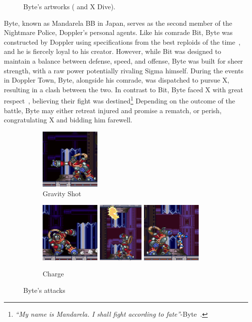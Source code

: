 \begin{figure}[htp]
	\caption{Byte's artworks (\cite{book:MMX_Complete_art} and X Dive).}
\end{figure}
Byte, known as Mandarela BB in Japan, serves as the second member of the Nightmare Police, Doppler's personal agents. Like his comrade Bit, Byte was constructed by Doppler using specifications from the best reploids of the time~\cite{book:MH_field_guide}, and he is fiercely loyal to his creator. However, while Bit was designed to maintain a balance between defense, speed, and offense, Byte was built for sheer strength, with a raw power potentially rivaling Sigma himself. During the events in Doppler Town, Byte, alongside his comrade, was dispatched to pursue X, resulting in a clash between the two. In contrast to Bit, Byte faced X with great respect~\cite{wiki:Byte}, believing their fight was destined\footnote{\textit{``My name is Mandarela. I shall fight according to fate''}-Byte~\cite{wordpress:X3_japanese_script}.} Depending on the outcome of the battle, Byte may either retreat injured and promise a rematch, or perish, congratulating X and bidding him farewell.
\begin{figure}[htp]
	\centering
	\begin{subfigure}{.4\linewidth}
		\centering
		\includegraphics[height=3cm]{figures/X3/Enemies/byte_manget.jpg}
		\caption{Gravity Shot}
	\end{subfigure}
	\begin{subfigure}{\linewidth}
		\centering
		\includegraphics[height=3cm]{figures/X3/Enemies/byte_combo_1.jpg}
		\includegraphics[height=3cm]{figures/X3/Enemies/byte_combo_2.jpg}
		\includegraphics[height=3cm]{figures/X3/Enemies/byte_combo_3.jpg}
		\caption{Charge}
	\end{subfigure}
	\caption{Byte's attacks}
\end{figure}


